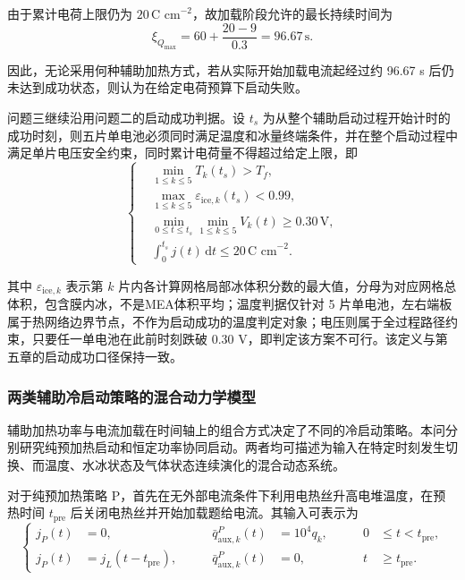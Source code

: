 \documentclass[bwprint]{gmcmthesis}
\numberwithin{equation}{section}
\numberwithin{figure}{section}
\begin{document}
 由于累计电荷上限仍为 \(20 \, \text{C cm}^{-2}\)，故加载阶段允许的最长持续时间为
\begin{equation}
\xi_{Q_{\text{max}}} = 60 + \frac{20 - 9}{0.3} = 96.67 \, \text{s}. \label{eq:src:6-18}
\end{equation}


 因此，无论采用何种辅助加热方式，若从实际开始加载电流起经过约 96.67 s 后仍未达到成功状态，则认为在给定电荷预算下启动失败。

 问题三继续沿用问题二的启动成功判据。设 \(t_s\) 为从整个辅助启动过程开始计时的成功时刻，则五片单电池必须同时满足温度和冰量终端条件，并在整个启动过程中满足单片电压安全约束，同时累计电荷量不得超过给定上限，即
\begin{equation}
\left\{
\begin{aligned}
& \min_{1 \leq k \leq 5} T_k(t_s) > T_f, \\
& \max_{1 \leq k \leq 5} \varepsilon_{\text{ice},k}(t_s) < 0.99, \\
& \min_{0 \leq t \leq t_s} \min_{1 \leq k \leq 5} V_k(t) \geq 0.30 \, \text{V}, \\
& \int_0^{t_s} j(t) \, \text{d}t \leq 20 \, \text{C cm}^{-2}.
\end{aligned}
\right.
\label{eq:src:6-19}
\end{equation}

 其中 \(\varepsilon_{\mathrm{ice},k}\) 表示第 \(k\) 片内各计算网格局部冰体积分数的最大值，分母为对应网格总体积，包含膜内冰，不是MEA体积平均；温度判据仅针对 5 片单电池，左右端板属于热网络边界节点，不作为启动成功的温度判定对象；电压则属于全过程路径约束，只要任一单电池在此前时刻跌破 0.30 V，即判定该方案不可行。该定义与第五章的启动成功口径保持一致。

\subsubsection{两类辅助冷启动策略的混合动力学模型}

 辅助加热功率与电流加载在时间轴上的组合方式决定了不同的冷启动策略。本问分别研究纯预加热启动和恒定功率协同启动。两者均可描述为输入在特定时刻发生切换、而温度、水冰状态及气体状态连续演化的混合动态系统。

 对于纯预加热策略 P，首先在无外部电流条件下利用电热丝升高电堆温度，在预热时间 \(t_{\text{pre}}\) 后关闭电热丝并开始加载题给电流。其输入可表示为
\begin{equation}
\left\{
\begin{aligned}
j_P(t) &= 0, \qquad & \bar{q}_{\text{aux},k}^P(t) &= 10^4 q_k, \qquad & 0 &\leq t < t_{\text{pre}}, \\
j_P(t) &= j_L(t - t_{\text{pre}}), \qquad & \bar{q}_{\text{aux},k}^P(t) &= 0, \qquad & t &\geq t_{\text{pre}}.
\end{aligned}
\right.
\label{eq:src:6-20}
\end{equation}
\end{document}
